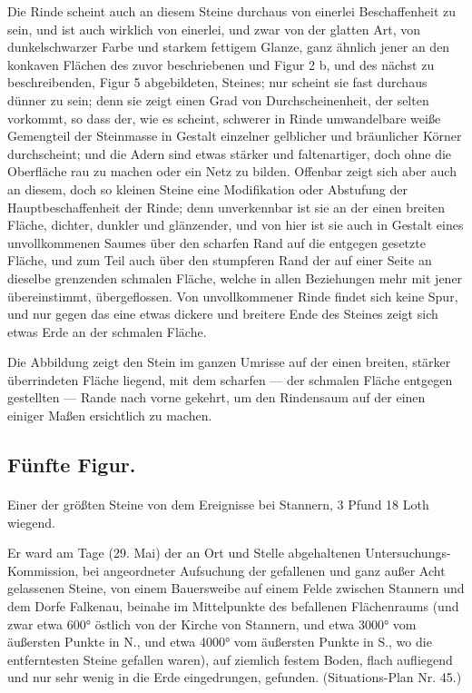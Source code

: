 \documentclass[a4paper, 11pt, oneside, german]{article}
\begin{document}
Die Rinde scheint auch an diesem Steine durchaus von einerlei Beschaffenheit zu sein, und ist auch wirklich von einerlei, und zwar von der glatten Art, von dunkelschwarzer Farbe und starkem fettigem Glanze, ganz ähnlich jener an den konkaven Flächen des zuvor beschriebenen und Figur 2 b, und des nächst zu beschreibenden, Figur 5 abgebildeten, Steines; nur scheint sie fast durchaus dünner zu sein; denn sie zeigt einen Grad von Durchscheinenheit, der selten vorkommt, so dass der, wie es scheint, schwerer in Rinde umwandelbare weiße Gemengteil der Steinmasse in Gestalt einzelner gelblicher und bräunlicher Körner durchscheint; und die Adern sind etwas stärker und faltenartiger, doch ohne die Oberfläche rau zu machen oder ein Netz zu bilden. Offenbar zeigt sich aber auch an diesem, doch so kleinen Steine eine Modifikation oder Abstufung der Hauptbeschaffenheit der Rinde; denn unverkennbar ist sie an der einen breiten Fläche, dichter, dunkler und glänzender, und von hier ist sie auch in Gestalt eines unvollkommenen Saumes über den scharfen Rand auf die entgegen gesetzte Fläche, und zum Teil auch über den stumpferen Rand der auf einer Seite an dieselbe grenzenden schmalen Fläche, welche in allen Beziehungen mehr mit jener übereinstimmt, übergeflossen. Von unvollkommener Rinde findet sich keine Spur, und nur gegen das eine etwas dickere und breitere Ende des Steines zeigt sich etwas Erde an der schmalen Fläche.

Die Abbildung zeigt den Stein im ganzen Umrisse auf der einen breiten, stärker überrindeten Fläche liegend, mit dem scharfen --- der schmalen Fläche entgegen gestellten --- Rande nach vorne gekehrt, um den Rindensaum auf der einen einiger Maßen ersichtlich zu machen.

\subsection{Fünfte Figur.}
\paragraph{}
Einer der größten Steine von dem Ereignisse bei Stannern, 3 Pfund 18 Loth wiegend.

Er ward am Tage (29. Mai) der an Ort und Stelle abgehaltenen Untersuchungs-Kommission, bei angeordneter Aufsuchung der gefallenen und ganz außer Acht gelassenen Steine, von einem Bauersweibe auf einem Felde zwischen Stannern und dem Dorfe Falkenau, beinahe im Mittelpunkte des befallenen Flächenraums (und zwar etwa 600° östlich von der Kirche von Stannern, und etwa 3000° vom äußersten Punkte in N., und etwa 4000° vom äußersten Punkte in S., wo die entferntesten Steine gefallen waren), auf ziemlich festem Boden, flach aufliegend und nur sehr wenig in die Erde eingedrungen, gefunden. (Situations-Plan Nr. 45.)
\end{document}
